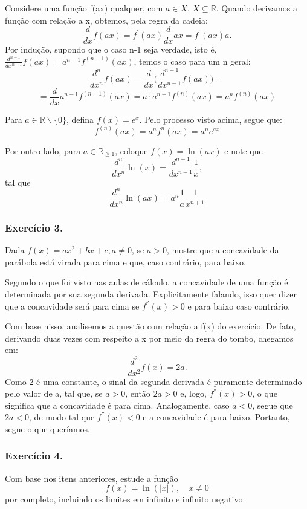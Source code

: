 \documentclass[exercícios_de_cálculo.tex]{subfiles}
\begin{document}
\begin{proof*}
	Considere uma função f(ax) qualquer, com $a\in{X}$, $X\subseteq{\mathbb{R}}$.
	Quando derivamos a função com relação a x, obtemos, pela regra da
	cadeia:
	\[
		\frac{d}{dx}f(ax) = f^{'}(ax)\frac{d}{dx}ax = f^{'}(ax)a.
	\]
	Por indução, supondo que o caso n-1 seja verdade, isto é,
	$\frac{d^{n-1}}{d x^{n-1}}f(ax) = a^{n-1}f^{(n-1)}(ax)$, temos o caso para um n
	geral:
	\[
		\frac{d^{n}}{d x^{n}}f(ax) = \frac{d}{dx}\biggl(\frac{d^{n-1}}{d x^{n-1}}f(ax)\biggr) =
	\]
	\[
		= \frac{d}{dx}a^{n-1}f^{(n-1)}(ax) = a\cdot{a^{n-1}}f^{(n)}(ax) = a^{n}f^{(n)}(ax)
	\]

	Para $a\in{\mathbb{R}\backslash\{0\}}$, defina $f(x) = e^{x}$. Pelo processo visto
	acima, segue que:
	\[
		f^{(n)}(ax) = a^{n}f^{n}(ax) = a^{n}e^{ax}
	\]

	Por outro lado, para $a\in{\mathbb{R}_{\geq1}}$, coloque $f(x) = \ln(ax)$ e
	note que
	\[
		\frac{d^{n}}{dx^{n}}\ln(x) = \frac{d^{n-1}}{dx^{n-1}}\frac{1}{x},
	\]
	tal que
	\[
		\frac{d^{n}}{dx^{n}}\ln(ax) = a^{n}\frac{1}{a}\frac{1}{x^{n+1}}
	\]
\end{proof*}

\subsubsection{Exercício 3.}
Dada $f(x) = ax^{2}+ bx + c, a\neq{0}$, se $a > 0$, mostre que a concavidade da
parábola está virada para cima e que, caso contrário, para baixo.

\begin{proof*}
	Segundo o que foi visto nas aulas de cálculo, a concavidade de uma função
	é determinada por sua segunda derivada. Explicitamente falando, isso quer
	dizer que a concavidade será para cima se $f^{''}(x) > 0$ e para baixo caso
	contrário.

	Com base nisso, analisemos a questão com relação a f(x) do exercício.
	De fato, derivando duas vezes com respeito a x por meio da regra do tombo,
	chegamos em:
	\[
		\frac{d^{2}}{dx^{2}}f(x) = 2a.
	\]
	Como 2 é uma constante, o sinal da segunda derivada é puramente
	determinado pelo valor de a, tal que, se $a > 0$, então $2a > 0$ e, logo, $f^{''}
		(x) > 0$, o que significa que a concavidade é para cima. Analogamente, caso $a
		< 0$, segue que $2a < 0$, de modo tal que $f^{''}(x) < 0$ e a concavidade é
	para baixo. Portanto, segue o que queríamos. \qedsymbol
\end{proof*}

\subsubsection{Exercício 4.}
Com base nos itens anteriores, estude a função
\[
	f(x) = \ln(|x|), \quad x\neq{0}
\]
por completo, incluindo os limites em infinito e infinito negativo.
\end{document}
